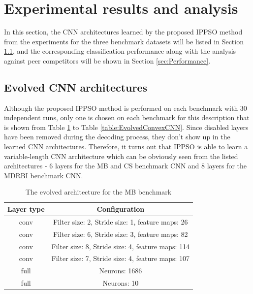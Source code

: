 \documentclass[conference]{IEEEtran}
\begin{document}
\section{Experimental results and analysis}\label{sec:EPResults}

In this section, the CNN architectures learned by the proposed IPPSO method from the experiments for the three benchmark datasets will be listed in Section \ref{sec:EvolvedCNN}, and the corresponding classification performance along with the analysis against peer competitors will be shown in Section \ref{sec:Performance}. 

\subsection{Evolved CNN architectures}\label{sec:EvolvedCNN}

Although the proposed IPPSO method is performed on each benchmark with 30 independent runs, only one is chosen on each benchmark for this description that is shown from Table \ref{table:EvolvedMBCNN} to Table \ref{table:EvolvedConvexCNN}. Since disabled layers have been removed during the decoding process, they don't show up in the learned CNN architectures. Therefore, it turns out that IPPSO is able to learn a variable-length CNN architecture which can be obviously seen from the listed architectures - 6 layers for the MB and CS benchmark CNN and 8 layers for the MDRBI benchmark CNN. 

\begin{table}[!t]
	\renewcommand{\arraystretch}{1.3}
	\caption{The evolved architecture for the MB benchmark}
	\label{table:EvolvedMBCNN}
	\centering
	\begin{tabular}{|c|c|}
		\hline
		Layer type & Configuration\\
		\hline
		conv & Filter size: 2, Stride size: 1, feature maps: 26\\
		\hline
		conv & Filter size: 6, Stride size: 3, feature maps: 82\\
		\hline
		conv & Filter size: 8, Stride size: 4, feature maps: 114\\
		\hline
		conv & Filter size: 7, Stride size: 4, feature maps: 107\\
		\hline
		full & Neurons: 1686\\
		\hline
		full & Neurons: 10\\
		\hline
	\end{tabular}
\end{table}
\end{document}
